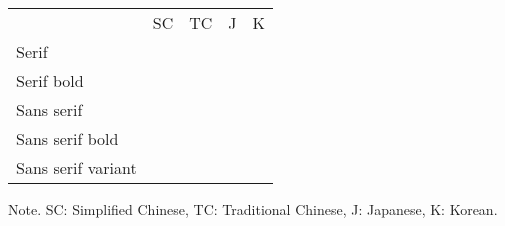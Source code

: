\documentclass{jsarticle}
\newcommand{\sampleSC}{\UTFC{76F4}\UTFC{9AA8}}
\newcommand{\sampleTC}{\UTFT{76F4}\UTFT{9AA8}}
\newcommand{\sampleJ}{\UTF{76F4}\UTF{9AA8}}
\newcommand{\sampleK}{\UTFK{76F4}\UTFK{9AA8}}
\begin{document}
\noindent
\begin{center}
 \begin{tabular}{lllll}
  & SC & TC & J & K\\
  Serif              
  & {\sampleSC}                   
  & %
  & {\sampleJ}                   
  & {\sampleK}                  
  \\
  Serif bold         
  & %
  & %
  & {\bfseries\sampleJ}          
  & {\bfseries\sampleK}         
  \\
  Sans serif         
  & {\gtfamily\sampleSC}          
  & %
  & {\gtfamily\sampleJ}          
  & {\gtfamily\sampleK}         
  \\
  Sans serif bold    
  & %
  & %
  & {\gtfamily\bfseries\sampleJ} 
  & {\gtfamily\bfseries\sampleK}
  \\
  Sans serif variant 
  & %
  & %
  & {\mgfamily\sampleJ}          
  & {\mgfamily\sampleK}         
 \end{tabular}
\end{center}

Note. SC: Simplified Chinese, TC: Traditional Chinese, J: Japanese, K: Korean.
\end{document}
